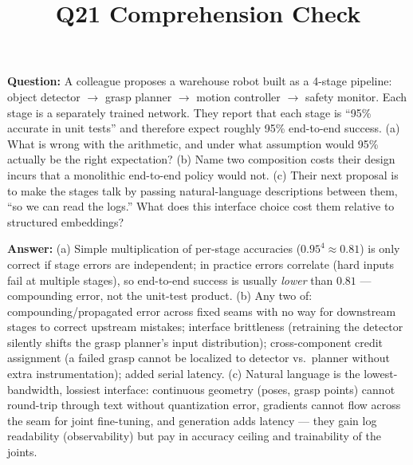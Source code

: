 \documentclass[11pt]{article}
\title{Q21 Comprehension Check}
\date{}
\begin{document}
\maketitle
\textbf{Question:} A colleague proposes a warehouse robot built as a 4-stage pipeline: object detector $\to$ grasp planner $\to$ motion controller $\to$ safety monitor. Each stage is a separately trained network. They report that each stage is ``95\% accurate in unit tests'' and therefore expect roughly 95\% end-to-end success. (a) What is wrong with the arithmetic, and under what assumption would 95\% actually be the right expectation? (b) Name two composition costs their design incurs that a monolithic end-to-end policy would not. (c) Their next proposal is to make the stages talk by passing natural-language descriptions between them, ``so we can read the logs.'' What does this interface choice cost them relative to structured embeddings?

\vspace{1em}
\textbf{Answer:} (a) Simple multiplication of per-stage accuracies ($0.95^4 \approx 0.81$) is only correct if stage errors are independent; in practice errors correlate (hard inputs fail at multiple stages), so end-to-end success is usually \emph{lower} than $0.81$ --- compounding error, not the unit-test product. (b) Any two of: compounding/propagated error across fixed seams with no way for downstream stages to correct upstream mistakes; interface brittleness (retraining the detector silently shifts the grasp planner's input distribution); cross-component credit assignment (a failed grasp cannot be localized to detector vs.\ planner without extra instrumentation); added serial latency. (c) Natural language is the lowest-bandwidth, lossiest interface: continuous geometry (poses, grasp points) cannot round-trip through text without quantization error, gradients cannot flow across the seam for joint fine-tuning, and generation adds latency --- they gain log readability (observability) but pay in accuracy ceiling and trainability of the joints.
\end{document}
